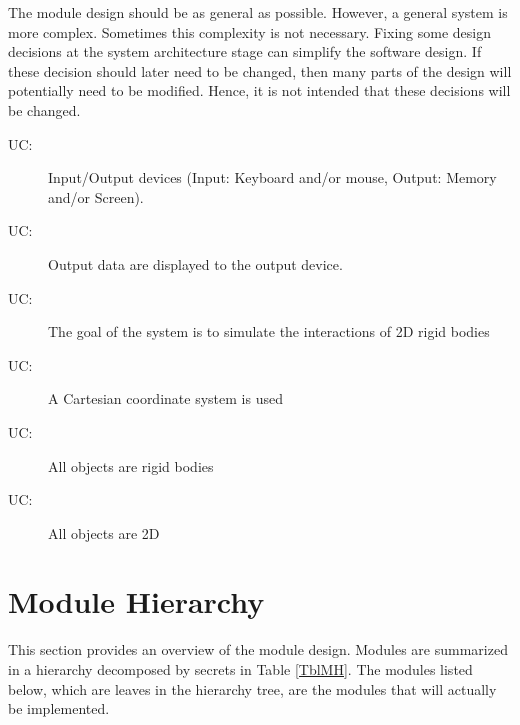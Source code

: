 \documentclass[12pt]{article}
\newcounter{ucnum}
\newcommand{\uctheucnum}{UC\theucnum}
\begin{document}
The module design should be as general as possible. However, a general system is
more complex. Sometimes this complexity is not necessary. Fixing some design
decisions at the system architecture stage can simplify the software design. If
these decision should later need to be changed, then many parts of the design
will potentially need to be modified. Hence, it is not intended that these
decisions will be changed. 


\begin{description}
\item[ \uctheucnum \label{ucIO}:] Input/Output devices
  (Input: Keyboard and/or mouse, Output: Memory and/or Screen).
\item[ \uctheucnum \label{ucOutput}:] Output data are
  displayed to the output device.
\item[ \uctheucnum \label{ucGoal}:] The goal of the system
  is to simulate the interactions of 2D rigid bodies
\item[ \uctheucnum \label{ucCartesian}:] A Cartesian 
coordinate system is used
\item[ \uctheucnum \label{ucRigid}:] All objects
are rigid bodies
\item[ \uctheucnum \label{uc2D}:] All objects
are 2D
\end{description}

\section{Module Hierarchy} \label{SecMH}

This section provides an overview of the module design. Modules are summarized
in a hierarchy decomposed by secrets in Table \ref{TblMH}. The modules listed
below, which are leaves in the hierarchy tree, are the modules that will
actually be implemented.
\end{document}
